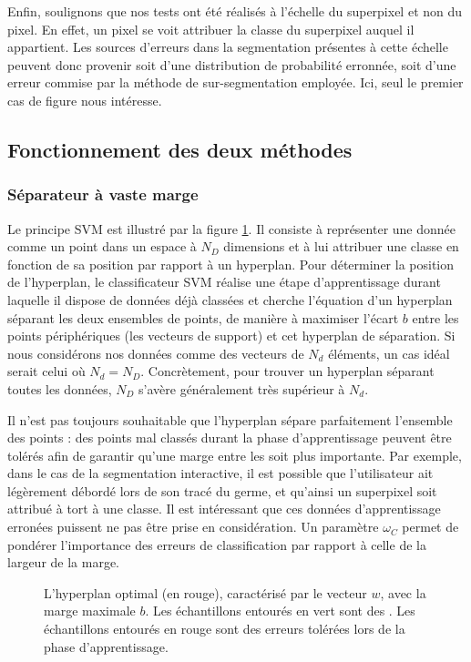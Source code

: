 Enfin, soulignons que nos tests ont été réalisés à l'échelle du superpixel et non du pixel. En effet, un pixel se voit attribuer la classe du superpixel auquel il appartient. Les sources d'erreurs dans la segmentation présentes à cette échelle peuvent donc provenir soit d'une distribution de probabilité erronnée, soit d'une erreur commise par la méthode de sur-segmentation employée. Ici, seul le premier cas de figure nous intéresse. 

\subsection{Fonctionnement des deux méthodes}
\subsubsection{Séparateur à vaste marge}

Le principe  SVM est illustré par la figure \ref{fig:saf:svm}. Il consiste à représenter une donnée comme un point dans un espace à $N_{D}$ dimensions et à lui attribuer une classe en fonction de sa position par rapport à un hyperplan. Pour déterminer la position de l’hyperplan, le classificateur SVM réalise une étape d’apprentissage durant laquelle il dispose de données déjà classées et cherche l’équation d’un hyperplan séparant les deux ensembles de points, de manière à maximiser l’écart $b$ entre les points périphériques (les vecteurs de support) et cet hyperplan de séparation. Si nous considérons nos données comme des vecteurs de $N_{d}$ éléments, un cas idéal serait celui où $N_{d} = N_{D}$. Concrètement, pour trouver un hyperplan séparant toutes les données, $N_{D}$ s’avère généralement très supérieur à $N_{d}$.

Il n’est pas toujours souhaitable que l’hyperplan sépare parfaitement l’ensemble des points : des points mal classés durant la phase d’apprentissage peuvent être tolérés afin de garantir qu’une marge entre les  soit plus importante. Par exemple, dans le cas de la segmentation interactive, il est possible que l’utilisateur ait légèrement débordé lors de son tracé du germe, et qu’ainsi un superpixel soit attribué à tort à une classe. Il est intéressant que ces données d’apprentissage erronées puissent ne pas être prise en considération. Un paramètre  $\omega_{C}$ permet de pondérer l’importance des erreurs de classification par rapport
à celle de la largeur de la marge.


\begin{figure}[htb]
\begin{center}
\scalebox{.5}{

}
\caption{L’hyperplan optimal (en rouge), caractérisé par le vecteur $w$, avec la marge maximale $b$.
Les échantillons entourés en vert sont des . Les échantillons entourés en rouge sont des
erreurs tolérées lors de la phase d’apprentissage.}
\label{fig:saf:svm}
\end{center}
\end{figure}

